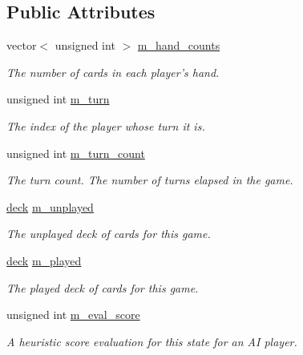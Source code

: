 \subsection*{\-Public \-Attributes}
\begin{DoxyCompactItemize}
\item 
\hypertarget{class_uno___game___state_a9fa2f495b04ea9572d2df80c30a28b8d}{
vector$<$ unsigned int $>$ \hyperlink{class_uno___game___state_a9fa2f495b04ea9572d2df80c30a28b8d}{m\-\_\-hand\-\_\-counts}}
\label{class_uno___game___state_a9fa2f495b04ea9572d2df80c30a28b8d}

\begin{DoxyCompactList}\small\item\em \-The number of cards in each player's hand. \end{DoxyCompactList}\item 
\hypertarget{class_uno___game___state_a85a2ea5d9e50359519aeeef2589fa8cf}{
unsigned int \hyperlink{class_uno___game___state_a85a2ea5d9e50359519aeeef2589fa8cf}{m\-\_\-turn}}
\label{class_uno___game___state_a85a2ea5d9e50359519aeeef2589fa8cf}

\begin{DoxyCompactList}\small\item\em \-The index of the player whose turn it is. \end{DoxyCompactList}\item 
\hypertarget{class_uno___game___state_abc3bb6447a74a7bf28c1dfbbfdcd6d55}{
unsigned int \hyperlink{class_uno___game___state_abc3bb6447a74a7bf28c1dfbbfdcd6d55}{m\-\_\-turn\-\_\-count}}
\label{class_uno___game___state_abc3bb6447a74a7bf28c1dfbbfdcd6d55}

\begin{DoxyCompactList}\small\item\em \-The turn count. \-The number of turns elapsed in the game. \end{DoxyCompactList}\item 
\hyperlink{uno__deck_8h_ab634a15f4d19d3af113a71241b79c408}{deck} \hyperlink{class_uno___game___state_a7bf61c252c9de176f309b691b4038345}{m\-\_\-unplayed}
\begin{DoxyCompactList}\small\item\em \-The unplayed deck of cards for this game. \end{DoxyCompactList}\item 
\hyperlink{uno__deck_8h_ab634a15f4d19d3af113a71241b79c408}{deck} \hyperlink{class_uno___game___state_ae274bd2383addaefbc78556c48757c35}{m\-\_\-played}
\begin{DoxyCompactList}\small\item\em \-The played deck of cards for this game. \end{DoxyCompactList}\item 
unsigned int \hyperlink{class_uno___game___state_ad55fa08fbfc6ddf4359194857dbd99fc}{m\-\_\-eval\-\_\-score}
\begin{DoxyCompactList}\small\item\em \-A heuristic score evaluation for this state for an \-A\-I player. \end{DoxyCompactList}\end{DoxyCompactItemize}


